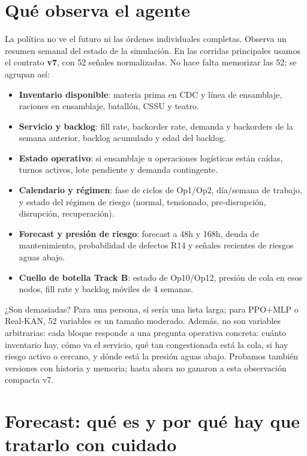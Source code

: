 \documentclass[11pt]{article}
\begin{document}
\section*{Qué observa el agente}

La política no ve el futuro ni las órdenes individuales completas. Observa un resumen semanal del
estado de la simulación. En las corridas principales usamos el contrato \textbf{v7}, con 52 señales
normalizadas. No hace falta memorizar las 52; se agrupan así:

\begin{itemize}
  \item \textbf{Inventario disponible}: materia prima en CDC y línea de ensamblaje, raciones en
        ensamblaje, batallón, CSSU y teatro.
  \item \textbf{Servicio y backlog}: fill rate, backorder rate, demanda y backorders de la semana
        anterior, backlog acumulado y edad del backlog.
  \item \textbf{Estado operativo}: si ensamblaje u operaciones logísticas están caídas, turnos
        activos, lote pendiente y demanda contingente.
  \item \textbf{Calendario y régimen}: fase de ciclos de Op1/Op2, día/semana de trabajo, y estado
        del régimen de riesgo (normal, tensionado, pre-disrupción, disrupción, recuperación).
  \item \textbf{Forecast y presión de riesgo}: forecast a 48h y 168h, deuda de mantenimiento,
        probabilidad de defectos R14 y señales recientes de riesgos aguas abajo.
  \item \textbf{Cuello de botella Track B}: estado de Op10/Op12, presión de cola en esos nodos,
        fill rate y backlog móviles de 4 semanas.
\end{itemize}

¿Son demasiadas? Para una persona, sí sería una lista larga; para PPO+MLP o Real-KAN, 52 variables
es un tamaño moderado. Además, no son variables arbitrarias: cada bloque responde a una pregunta
operativa concreta: cuánto inventario hay, cómo va el servicio, qué tan congestionada está la cola,
si hay riesgo activo o cercano, y dónde está la presión aguas abajo. Probamos también versiones con
historia y memoria; hasta ahora no ganaron a esta observación compacta v7.

\section*{Forecast: qué es y por qué hay que tratarlo con cuidado}
\end{document}
